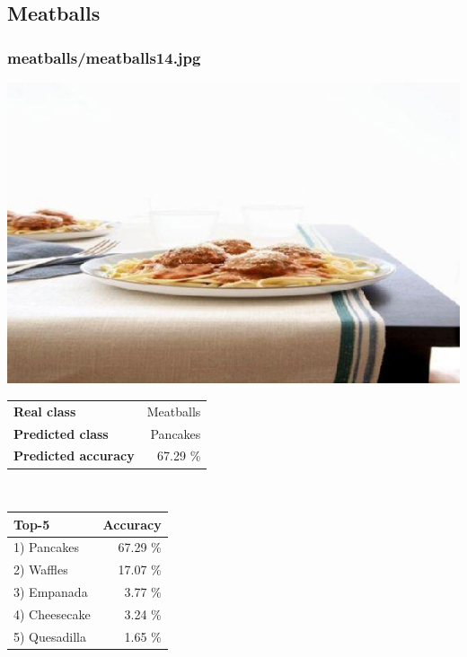 \subsection{Meatballs}
    
\subsubsection{meatballs/meatballs14.jpg}

\begin{minipage}[t]{0.4\textwidth}
	\vspace{0pt}
	\includegraphics[width=\linewidth]{images/evaluation-images/meatballs/meatballs14.jpg}
\end{minipage}
\hfill
\begin{minipage}[t]{0.5\textwidth}
	\vspace{0pt}\raggedright
	\begin{tabularx}{\textwidth}{X r}
		\small \textbf{Real class} & \small Meatballs\\
		\small \textbf{Predicted class} & \small Pancakes\\
		\small \textbf{Predicted accuracy} & \small 67.29 \%
    \end{tabularx}\\
    
    \vspace{6pt}
	\begin{tabularx}{\textwidth}{X r}
        \small \textbf{Top-5} & \small \textbf{Accuracy} \\
        \hline
		\small 1) Pancakes & \small 67.29 \%\\\small 2) Waffles & \small 17.07 \%\\\small 3) Empanada & \small 3.77 \%\\\small 4) Cheesecake & \small 3.24 \%\\\small 5) Quesadilla & \small 1.65 \%
    \end{tabularx}
\end{minipage}
    
